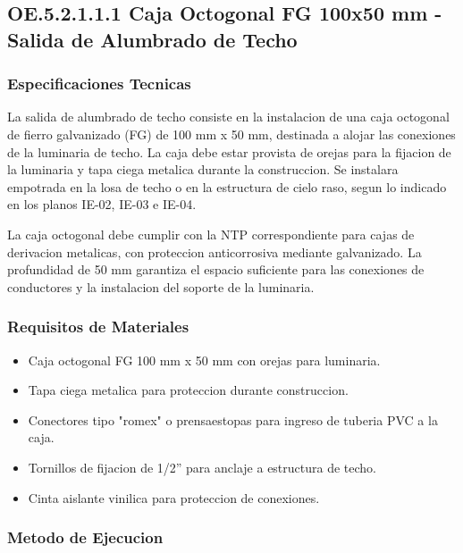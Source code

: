 \subsection{OE.5.2.1.1.1 Caja Octogonal FG 100x50 mm - Salida de Alumbrado de Techo}

\subsubsection{Especificaciones Tecnicas}

La salida de alumbrado de techo consiste en la instalacion de una caja octogonal de fierro galvanizado (FG) de 100 mm x 50 mm, destinada a alojar las conexiones de la luminaria de techo. La caja debe estar provista de orejas para la fijacion de la luminaria y tapa ciega metalica durante la construccion. Se instalara empotrada en la losa de techo o en la estructura de cielo raso, segun lo indicado en los planos IE-02, IE-03 e IE-04.

La caja octogonal debe cumplir con la NTP correspondiente para cajas de derivacion metalicas, con proteccion anticorrosiva mediante galvanizado. La profundidad de 50 mm garantiza el espacio suficiente para las conexiones de conductores y la instalacion del soporte de la luminaria.

\subsubsection{Requisitos de Materiales}

\begin{itemize}
  \item Caja octogonal FG 100 mm x 50 mm con orejas para luminaria.
  \item Tapa ciega metalica para proteccion durante construccion.
  \item Conectores tipo "romex" o prensaestopas para ingreso de tuberia PVC a la caja.
  \item Tornillos de fijacion de 1/2'' para anclaje a estructura de techo.
  \item Cinta aislante vinilica para proteccion de conexiones.
\end{itemize}

\subsubsection{Metodo de Ejecucion}

